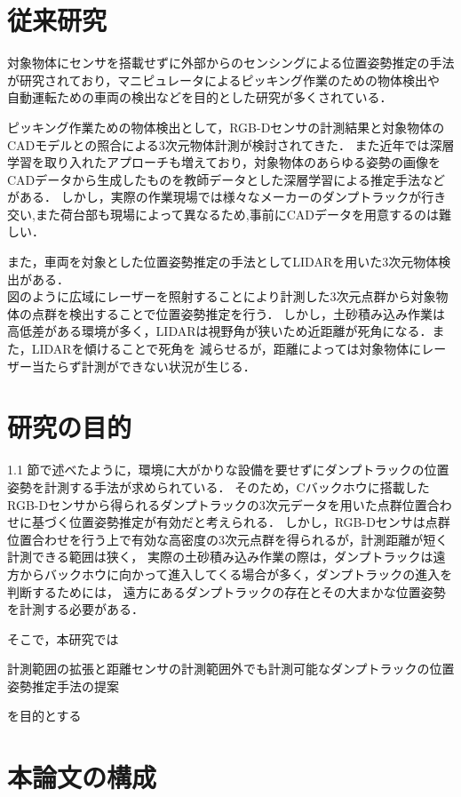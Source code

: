 \newpage
\section{従来研究}
対象物体にセンサを搭載せずに外部からのセンシングによる位置姿勢推定の手法が研究されており，マニピュレータによるピッキング作業のための物体検出や
自動運転ための車両の検出などを目的とした研究が多くされている．

ピッキング作業ための物体検出として，RGB-Dセンサの計測結果と対象物体のCADモデルとの照合による3次元物体計測が検討されてきた．\cite{中原智治2001}\cite{林2008}\cite{西卓郎2014}
また近年では深層学習を取り入れたアプローチも増えており，対象物体のあらゆる姿勢の画像をCADデータから生成したものを教師データとした深層学習による推定手法\cite{Sundermeyer2018}\cite{Tremblay2018}などがある．
しかし，実際の作業現場では様々なメーカーのダンプトラックが行き交い,また荷台部も現場によって異なるため,事前にCADデータを用意するのは難しい．

また，車両を対象とした位置姿勢推定の手法としてLIDARを用いた3次元物体検出がある．\cite{Zhang2017}\cite{Chen2017}\cite{Lang2019}\\
図のように広域にレーザーを照射することにより計測した3次元点群から対象物体の点群を検出することで位置姿勢推定を行う．
しかし，土砂積み込み作業は高低差がある環境が多く，LIDARは視野角が狭いため近距離が死角になる．また，LIDARを傾けることで死角を
減らせるが，距離によっては対象物体にレーザー当たらず計測ができない状況が生じる．


\section{研究の目的}
1.1 節で述べたように，環境に大がかりな設備を要せずにダンプトラックの位置姿勢を計測する手法が求められている．
そのため，Cバックホウに搭載したRGB-Dセンサから得られるダンプトラックの3次元データを用いた点群位置合わせに基づく位置姿勢推定が有効だと考えられる．
しかし，RGB-Dセンサは点群位置合わせを行う上で有効な高密度の3次元点群を得られるが，計測距離が短く計測できる範囲は狭く，
実際の土砂積み込み作業の際は，ダンプトラックは遠方からバックホウに向かって進入してくる場合が多く，ダンプトラックの進入を判断するためには，
遠方にあるダンプトラックの存在とその大まかな位置姿勢を計測する必要がある．



\par
そこで，本研究では
    \begin{screen}
        \begin{center}
        計測範囲の拡張と距離センサの計測範囲外でも計測可能なダンプトラックの位置姿勢推定手法の提案
        \end{center}
    \end{screen}
を目的とする
\section{本論文の構成}

